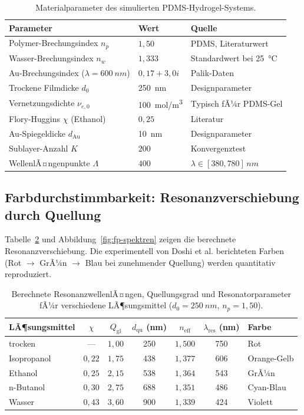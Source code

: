 ﻿\documentclass[a4paper,12pt]{article}
\theoremstyle{definition}
\newcommand{\neff}{n_\mathrm{eff}}
\begin{document}
	\begin{table}[htb]
		\centering
		\caption{Materialparameter des simulierten PDMS-Hydrogel-Systems.}
		\label{tab:parameter}
		\begin{tabular}{lll}
			\toprule
			\textbf{Parameter} & \textbf{Wert} & \textbf{Quelle}\\
			\midrule
			Polymer-Brechungsindex $n_p$ & $1{,}50$ & PDMS, Literaturwert\\
			Wasser-Brechungsindex $n_w$ & $1{,}333$ & Standardwert bei \SI{25}{\celsius}\\
			Au-Brechungsindex ($\lambda = \SI{600}{nm}$) & $0{,}17 + 3{,}0i$ & Palik-Daten\\
			Trockene Filmdicke $d_0$ & \SI{250}{nm} & Designparameter\\
			Vernetzungsdichte $\nu_{e,0}$ & \SI{100}{mol/m^3} & Typisch fÃ¼r PDMS-Gel\\
			Flory-Huggins $\chi$ (Ethanol) & $0{,}25$ & Literatur\\
			Au-Spiegeldicke $d_\mathrm{Au}$ & \SI{10}{nm} & Designparameter\\
			Sublayer-Anzahl $K$ & $200$ & Konvergenztest\\
			WellenlÃ¤ngenpunkte $\Lambda$ & $400$ & $\lambda \in [380, 780]\,\si{nm}$\\
			\bottomrule
		\end{tabular}
	\end{table}
	
	\subsection{Farbdurchstimmbarkeit: Resonanzverschiebung durch Quellung}
	
	Tabelle~\ref{tab:farbtuning} und Abbildung~\ref{fig:fp-spektren} zeigen
	die berechnete Resonanzverschiebung. Die experimentell von Doshi et al.
	berichteten Farben (Rot $\to$ GrÃ¼n $\to$ Blau bei zunehmender Quellung)
	werden quantitativ reproduziert.
	
	\begin{table}[htb]
		\centering
		\caption{Berechnete ResonanzwellenlÃ¤ngen, Quellungsgrad und
			Resonatorparameter fÃ¼r verschiedene LÃ¶sungsmittel ($d_0 = \SI{250}{nm}$,
			$n_p = 1{,}50$).}
		\label{tab:farbtuning}
		\begin{tabular}{lcccccl}
			\toprule
			\textbf{LÃ¶sungsmittel} & $\chi$ & $Q_\mathrm{gl}$ & $d_\mathrm{qu}$ (nm)
			& $\neff$ & $\lambda_\mathrm{res}$ (nm) & \textbf{Farbe}\\
			\midrule
			trocken & --- & $1{,}00$ & 250 & $1{,}500$ & 750 & Rot\\
			Isopropanol & $0{,}22$ & $1{,}75$ & 438 & $1{,}377$ & 606 & Orange-Gelb\\
			Ethanol & $0{,}25$ & $2{,}15$ & 538 & $1{,}364$ & 543 & GrÃ¼n\\
			n-Butanol & $0{,}30$ & $2{,}75$ & 688 & $1{,}351$ & 486 & Cyan-Blau\\
			Wasser & $0{,}43$ & $3{,}60$ & 900 & $1{,}339$ & 424 & Violett\\
			\bottomrule
		\end{tabular}
	\end{table}
	
\end{document}
